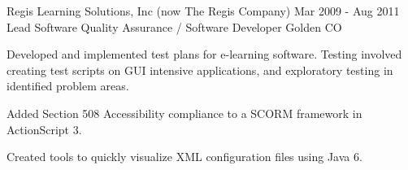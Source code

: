 \documentclass[10pt]{article}
\begin{document}
{	\job
	{Regis Learning Solutions, Inc (now The Regis Company)}
	{Mar 2009 - Aug 2011}
	{Lead Software Quality Assurance / Software Developer}
	{Golden CO}
	{
	\begin{newitemize}
		\item Developed and implemented test plans for e-learning
software. Testing involved creating test scripts on GUI
intensive applications, and exploratory testing in identified
problem areas.
 		\item Added Section 508 Accessibility compliance to a SCORM
framework in ActionScript 3.
		\item Created tools to quickly visualize XML configuration files
using Java 6.
	\end{newitemize}
	}
}



\end{document}
